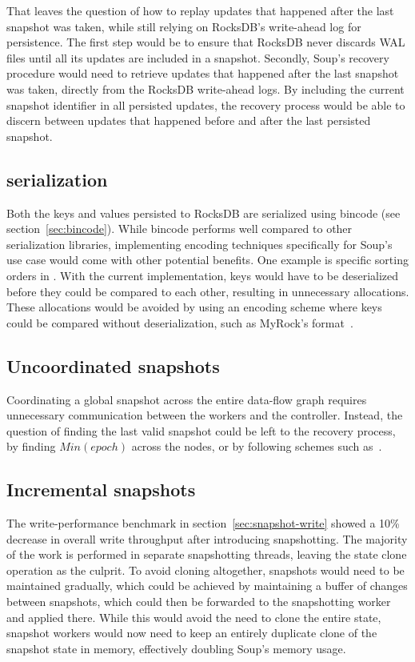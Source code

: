 That leaves the question of how to replay updates that happened after the last
snapshot was taken, while still relying on RocksDB's write-ahead log for
persistence. The first step would be to ensure that RocksDB never discards WAL
files until all its updates are included in a snapshot. Secondly, Soup's
recovery procedure would need to retrieve updates that happened after the last
snapshot was taken, directly from the RocksDB write-ahead logs. By including the
current snapshot identifier in all persisted updates, the recovery process would
be able to discern between updates that happened before and after the last
persisted snapshot.

\subsection{ serialization}

Both the keys and values persisted to RocksDB are serialized using bincode (see
section~\ref{sec:bincode}). While bincode performs well compared to other
serialization libraries, implementing encoding techniques specifically for
Soup's use case would come with other potential benefits. One example is
specific sorting orders in . With the current
implementation, keys would have to be deserialized before they could be compared
to each other, resulting in unnecessary allocations. These allocations would be
avoided by using an encoding scheme where keys could be compared without
deserialization, such as \eg MyRock's 
format~\cite{myrocks-encoding}.

\subsection{Uncoordinated snapshots}

Coordinating a global snapshot across the entire data-flow graph requires
unnecessary communication between the workers and the controller. Instead, the
question of finding the last valid snapshot could be left to the recovery
process, \eg by finding $ Min(epoch) $ across the nodes, or by following schemes
such as~\cite{falkirk}.

\subsection{Incremental snapshots}

The write-performance benchmark in section~\ref{sec:snapshot-write} showed a
10\% decrease in overall write throughput after introducing snapshotting. The
majority of the work is performed in separate snapshotting threads, leaving the
state clone operation as the culprit. To avoid cloning altogether, snapshots
would need to be maintained gradually, which could be achieved by maintaining a
buffer of changes between snapshots, which could then be forwarded to the
snapshotting worker and applied there. While this would avoid the need to clone
the entire state, snapshot workers would now need to keep an entirely duplicate
clone of the snapshot state in memory, effectively doubling Soup's memory usage.

